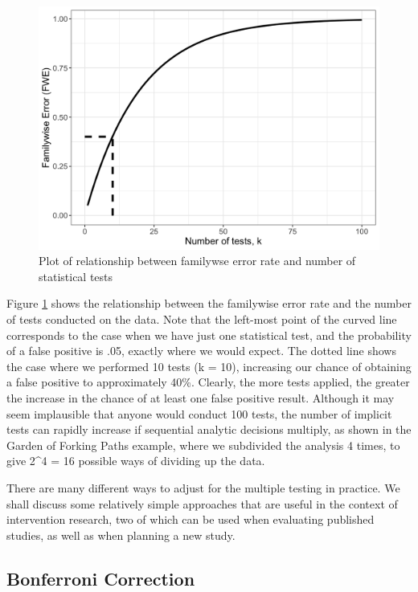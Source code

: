 \documentclass{krantz}
\begin{document}
\begin{figure}
\includegraphics[width=0.8\linewidth]{images_bw/familywise} \caption{Plot of relationship between familywse error rate and number of statistical tests}\label{fig:familywise}
\end{figure}

Figure \ref{fig:familywise} shows the relationship between the familywise error rate and the number of tests conducted on the data. Note that the left-most point of the curved line corresponds to the case when we have just one statistical test, and the probability of a false positive is .05, exactly where we would expect. The dotted line shows the case where we performed 10 tests (k = 10), increasing our chance of obtaining a false positive to approximately 40\%. Clearly, the more tests applied, the greater the increase in the chance of at least one false positive result. Although it may seem implausible that anyone would conduct 100 tests, the number of implicit tests can rapidly increase if sequential analytic decisions multiply, as shown in the Garden of Forking Paths example, where we subdivided the analysis 4 times, to give 2\^{}4 = 16 possible ways of dividing up the data.

There are many different ways to adjust for the multiple testing in practice. We shall discuss some relatively simple approaches that are useful in the context of intervention research, two of which can be used when evaluating published studies, as well as when planning a new study.

\hypertarget{bonferroni-correction}{%
\subsection{Bonferroni Correction}\label{bonferroni-correction}}
\end{document}

